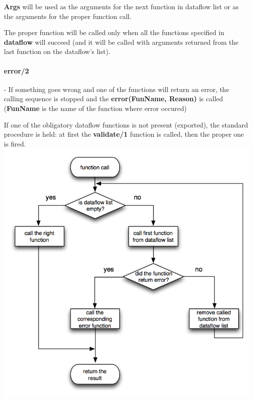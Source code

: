 {\bf Args} will be used as the arguments for the next function in dataflow list or as the arguments for the proper function call. 

The proper function will be called only when all the functions specified in {\bf dataflow} will succeed (and it will be called with arguments returned from the last function on the dataflow's list). 
\paragraph{error/2}- If something goes wrong and one of the functions will return an error, the calling sequence is stopped and the {\bf error(FunName, Reason)} is called ({\bf FunName} is the name of the function where error occured)

If one of the obligatory dataflow functions is not present (exported), the standard procedure is held: at first the {\bf validate/1} function is called, then the proper one is fired.
\includegraphics[width=\textwidth]{images/dataflow.jpg}

